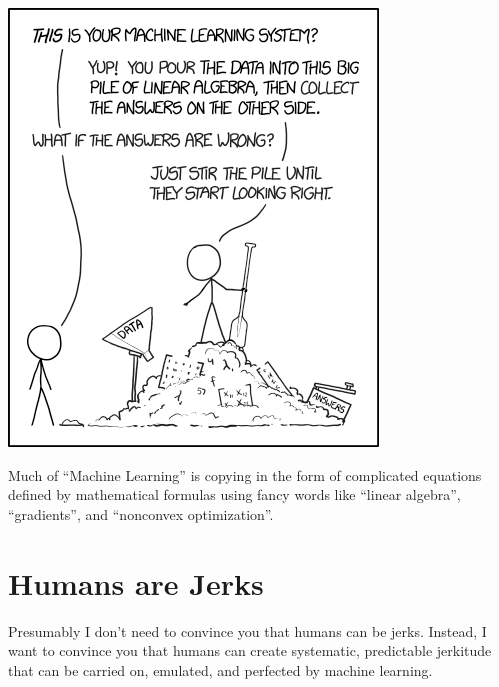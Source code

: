 \begin{marginfigure}%
  \includegraphics[width=\linewidth]{figures/xkcd-la-ml}
  \caption{Much of ``Machine Learning'' is copying in the form of
    complicated equations defined by mathematical formulas using fancy
    words like ``linear algebra'', ``gradients'', and ``nonconvex optimization''.}
  \label{fig:la-ml}
\end{marginfigure}

\section{Humans are Jerks}



Presumably I don't need to convince you that humans can be jerks.
Instead, I want to convince you that humans can create systematic,
predictable jerkitude that can be carried on, emulated, and perfected
by machine learning.

